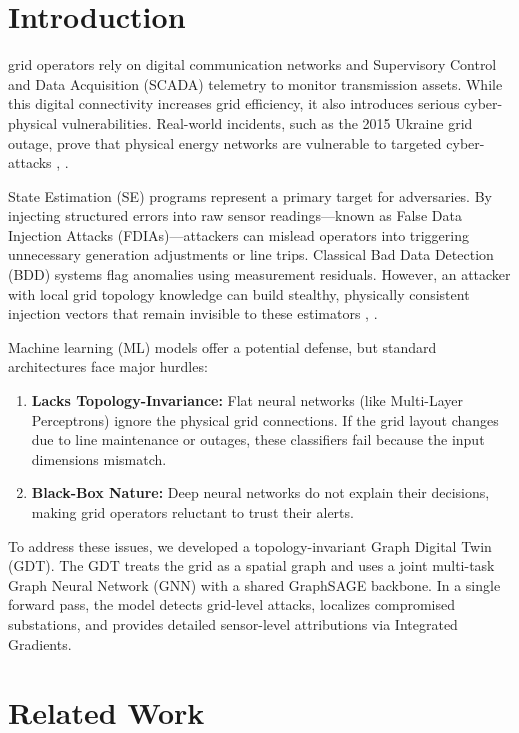 \documentclass[journal]{IEEEtran}
\begin{document}
\section{Introduction}
 grid operators rely on digital communication networks and Supervisory Control and Data Acquisition (SCADA) telemetry to monitor transmission assets. While this digital connectivity increases grid efficiency, it also introduces serious cyber-physical vulnerabilities. Real-world incidents, such as the 2015 Ukraine grid outage, prove that physical energy networks are vulnerable to targeted cyber-attacks \cite{b1}, \cite{b9}.

State Estimation (SE) programs represent a primary target for adversaries. By injecting structured errors into raw sensor readings—known as False Data Injection Attacks (FDIAs)—attackers can mislead operators into triggering unnecessary generation adjustments or line trips. Classical Bad Data Detection (BDD) systems flag anomalies using measurement residuals. However, an attacker with local grid topology knowledge can build stealthy, physically consistent injection vectors that remain invisible to these estimators \cite{b3}, \cite{b4}.

Machine learning (ML) models offer a potential defense, but standard architectures face major hurdles:
\begin{enumerate}
    \item \textbf{Lacks Topology-Invariance:} Flat neural networks (like Multi-Layer Perceptrons) ignore the physical grid connections. If the grid layout changes due to line maintenance or outages, these classifiers fail because the input dimensions mismatch.
    \item \textbf{Black-Box Nature:} Deep neural networks do not explain their decisions, making grid operators reluctant to trust their alerts.
\end{enumerate}

To address these issues, we developed a topology-invariant Graph Digital Twin (GDT). The GDT treats the grid as a spatial graph and uses a joint multi-task Graph Neural Network (GNN) with a shared GraphSAGE backbone. In a single forward pass, the model detects grid-level attacks, localizes compromised substations, and provides detailed sensor-level attributions via Integrated Gradients.

\section{Related Work}
\end{document}

